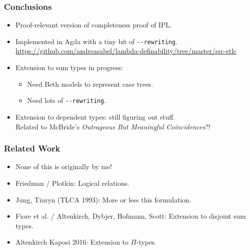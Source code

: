 \documentclass[t,fleqn,usenames,dvipsnames]{beamer}
\newcommand{\cAnn}{\color{red!80!black}}%
\renewcommand{\emph}[1]{{\cAnn#1}}
\newcommand{\cType}{\color{orange!60!black}}
\renewcommand{\emph}[1]{\textit{\cType#1}}
\begin{document}
\begin{frame}[fragile=singleslide]
  \frametitle{Conclusions}
  \vspace{-3ex}
  \begin{itemize}
  \item Proof-relevant version of completeness proof of IPL.
  \item Implemented in Agda with a tiny bit of \verb|--rewriting|.\\
  \url{https://github.com/andreasabel/lambda-definability/tree/master/src-stlc}
  \item Extension to sum types in progress:
    \begin{itemize}
    \item Need Beth models to represent case trees.
    \item Need lots of \verb|--rewriting|.
    \end{itemize}
  \item Extension to dependent types: still figuring out stuff. \\
    Related to McBride's \emph{Outrageous But Meaningful Coincidences}?!
  \end{itemize}
\end{frame}

\begin{frame}%
  \frametitle{Related Work}
  \begin{itemize}
  \item None of this is originally by me!
  \item Friedman / Plotkin: Logical relations.
  \item Jung, Tiuryn (TLCA 1993): More or less this formulation.
  \item Fiore et al. / Altenkirch, Dybjer, Hofmann, Scott: Extension to disjoint sum types.
  \item Altenkirch Kaposi 2016: Extension to $\Pi$-types.
  \end{itemize}
\end{frame}





% 
\end{document}
